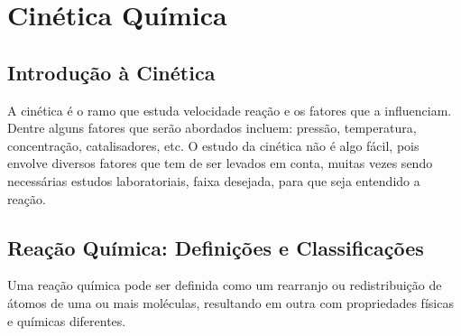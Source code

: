 \chapter{Cinética Química}

\section{Introdução à Cinética}

A cinética é o ramo que estuda velocidade reação e os fatores que a influenciam. Dentre alguns
fatores que serão abordados incluem: pressão, temperatura, concentração, catalisadores, etc. O
estudo da cinética não é algo fácil, pois envolve diversos fatores que tem de ser levados em conta,
muitas vezes sendo necessárias estudos laboratoriais, faixa desejada, para que seja entendido a
reação. \par

\section{Reação Química: Definições e Classificações}

Uma reação química pode ser definida como um rearranjo ou redistribuição de átomos de uma ou mais
moléculas, resultando em outra com propriedades físicas e químicas diferentes. \par

